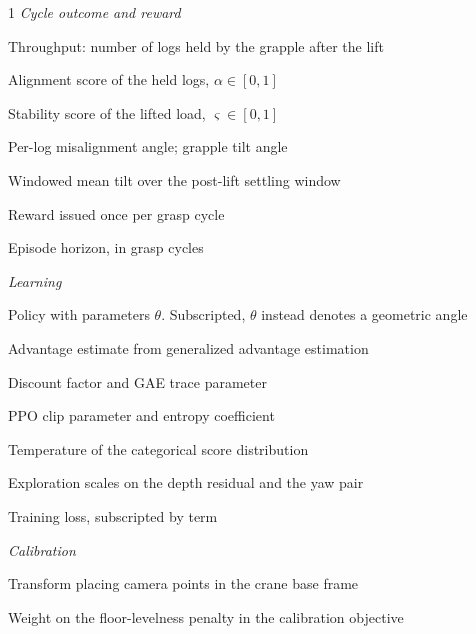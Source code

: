 \documentclass[12pt, letterpaper]{report}
\begin{document}
\begin{spacing}{1}
\noindent\textit{Cycle outcome and reward}
\begin{description}[leftmargin=3.2em, style=sameline]
\item[$n$] Throughput: number of logs held by the grapple after the lift
\item[$\alpha$] Alignment score of the held logs, $\alpha \in [0, 1]$
\item[$\varsigma$] Stability score of the lifted load, $\varsigma \in [0, 1]$
\item[$\theta_{\alpha_i}$, $\theta_\varsigma$] Per-log misalignment angle; grapple tilt angle
\item[$\bar{\theta}$] Windowed mean tilt over the post-lift settling window
\item[$r$] Reward issued once per grasp cycle
\item[$H$] Episode horizon, in grasp cycles
\end{description}

\noindent\textit{Learning}
\begin{description}[leftmargin=3.2em, style=sameline]
\item[$\pi_\theta$] Policy with parameters $\theta$. Subscripted, $\theta$ instead denotes a geometric angle
\item[$\hat{A}_t$] Advantage estimate from generalized advantage estimation
\item[$\gamma$, $\lambda$] Discount factor and GAE trace parameter
\item[$\epsilon$, $\beta$] PPO clip parameter and entropy coefficient
\item[$\tau$] Temperature of the categorical score distribution
\item[$\sigma_\delta$, $\sigma_q$] Exploration scales on the depth residual and the yaw pair
\item[$\mathcal{L}$] Training loss, subscripted by term
\end{description}

\noindent\textit{Calibration}
\begin{description}[leftmargin=3.2em, style=sameline]
\item[$T_{\mathrm{base} \leftarrow \mathrm{cam}}$] Transform placing camera points in the crane base frame
\item[$w$] Weight on the floor-levelness penalty in the calibration objective
\end{description}
\end{spacing}

\clearpage
{}












\end{document}

